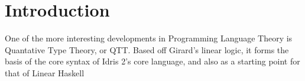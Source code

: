 \section{Introduction}

One of the more interesting developments in Programming Language Theory is Quantative Type Theory, or QTT.
Based off Girard's linear logic, it forms the basis of the core syntax of Idris 2's core language, and also as a starting point for that of Linear Haskell \cite{idris,linear_haskell,linear_logic,syntax_semantics_linear_types}